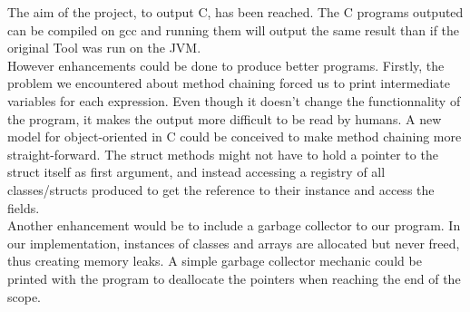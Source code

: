 
The aim of the project, to output C, has been reached. The C programs outputed can be compiled on gcc and running them will output the same result than if the original Tool was run on the JVM.\\
However enhancements could be done to produce better programs. Firstly, the problem we encountered about method chaining forced us to print intermediate variables for each expression. Even though it doesn't change the functionnality of the program, it makes the output more difficult to be read by humans. A new model for object-oriented in C could be conceived to make method chaining more straight-forward. The struct methods might not have to hold a pointer to the struct itself as first argument, and instead accessing a registry of all classes/structs produced to get the reference to their instance and access the fields.\\
Another enhancement would be to include a garbage collector\cite{gc} to our program. In our implementation, instances of classes and arrays are allocated but never freed, thus creating memory leaks. A simple garbage collector mechanic could be printed with the program to deallocate the pointers when reaching the end of the scope. 
\newline
